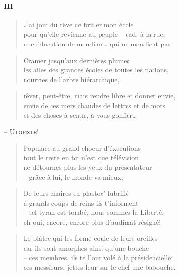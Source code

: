   \paragraph*{III}
    \begin{verse}
      J’ai joui du rêve de brûler mon école\\
      pour qu’elle revienne au peuple -- cad, à la rue,\\
      une éducation de mendiants qui ne mendient pas.
    \end{verse}
    \begin{verse}
      Cramer jusqu’aux dernières plumes\\
      les ailes des grandes écoles de toutes les nations,\\
      nourries de l’arbre hiérarchique,
    \end{verse}
    \begin{verse}
      rêver, peut-être, mais rendre libre et donner envie,\\
      envie de ces mers chaudes de lettres et de mots\\
      et des choses à sentir, à vous gonfler…
    \end{verse}
  \begin{center}
    -- \textsc{Utopiste!}
  \end{center}
  \begin{verse}
    Populace au grand choeur d’éxécutions\\
    tout le reste en toi n’est que télévision\\
    ne détournes plus les yeux du présentateur\\
    -- grâce à lui, le monde va mieux;
  \end{verse}
  \begin{verse}
    De leurs chaires en plastoc’ lubrifié\\
    à grands coups de reins ils t’informent\\
    -- tel tyran est tombé, nous sommes la Liberté,\\
    oh oui, encore, encore plus d’audimat résigné!
  \end{verse}
  \begin{verse}
    Le plâtre qui les forme coule de leurs oreilles\\
    car ils sont amorphes ainsi qu’une bouche\\
    -- ces membres, ils te l’ont volé à la présidencielle;\\
    ces messieurs, jettes leur sur le chef une babouche.
  \end{verse}
